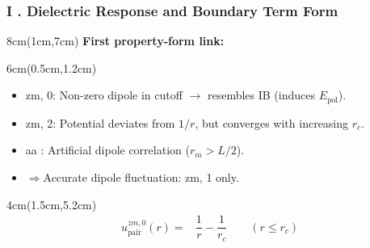 \documentclass{beamer}
\begin{document}
	\begin{frame}
		\frametitle{I . Dielectric Response and Boundary Term Form}
		\footnotesize
		
		\begin{textblock*}{8cm}(1cm,7cm)  
			\textbf{	First property-form link: } \\  [5pt  ]
			
			
		\end{textblock*}
		
		\begin{textblock*}{6cm}(0.5cm,1.2cm)  
			\begin{itemize}
				\item[$\bullet$] zm, 0: Non-zero dipole in cutoff $\rightarrow$ resembles IB (induces $E_{\text{pol}}$).
				\item[$\bullet$] zm, 2: Potential deviates from $1/r$, but converges with increasing $r_c$.
				\item[$\bullet$] aa : Artificial dipole correlation ($r_m > L/2$).
				\item[$\bullet$] $\Rightarrow$Accurate dipole fluctuation: zm, 1 only.
			\end{itemize}
		\end{textblock*}
		
		\begin{textblock*}{4cm}(1.5cm,5.2cm)  
			\begin{align*}
				u_{\text{pair}}^{zm,0} (r) =&  \dfrac{1}{r} - \dfrac{1}{r_c} \qquad (r \le r_c)  
			\end{align*}
		\end{textblock*}
		

\end{frame}
\end{document}

